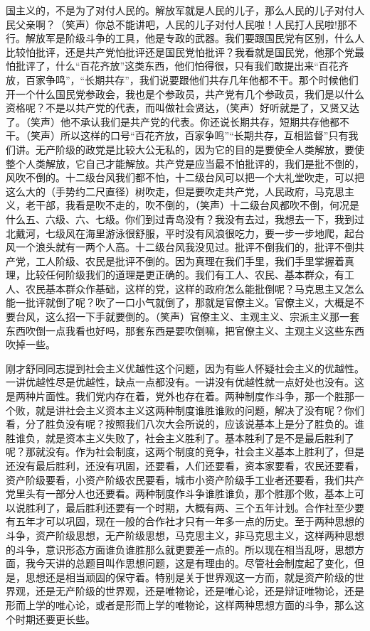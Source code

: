 国主义的，不是为了对付人民的。解放军就是人民的儿子，那么人民的儿子对付人民父亲啊？（笑声）你总不能讲吧，人民的儿子对付人民啦！人民打人民啦!那不行。解放军是阶级斗争的工具，他是专政的武器。我们要跟国民党有区别，什么人比较怕批评，还是共产党怕批评还是国民党怕批评？我看就是国民党，他那个党最怕批评了，什么“百花齐放”这类东西，他们怕得很，只有我们敢提出来“百花齐放，百家争鸣”，“长期共存”，我们说要跟他们共存几年他都不干。那个时候他们开一个什么国民党参政会，我也是个参政员，共产党有几个参政员，我们是以什么资格呢？不是以共产党的代表，而叫做社会贤达，（笑声）好听就是了，又贤又达了。（笑声）他不承认我们是共产党的代表。你还说长期共存，短期共存他都不干。（笑声）所以这样的口号“百花齐放，百家争鸣”“长期共存，互相监督”只有我们讲。无产阶级的政党是比较大公无私的，因为它的目的是要使全人类解放，要使整个人类解放，它自己才能解放。共产党是应当最不怕批评的，我们是批不倒的，风吹不倒的。十二级台风我们都不怕，十二级台风可以把一个大礼堂吹走，可以把这么大的（手势约二尺直径）树吹走，但是要吹走共产党，人民政府，马克思主义，老干部，我看是吹不走的，吹不倒的，（笑声）十二级台风都吹不倒，何况是什么五、六级、六、七级。你们到过青岛没有？我没有去过，我想去一下，我到过北戴河，七级风在海里游泳很舒服，平时没有风浪很吃力，要一步一步地爬，起台风一个浪头就有一两个人高。十二级台风我没见过。批评不倒我们的，批评不倒共产党，工人阶级、农民是批评不倒的。因为真理在我们手里，我们手里掌握着真理，比较任何阶级我们的道理是更正确的。我们有工人、农民、基本群众，有工人、农民基本群众作基础，这样的党，这样的政府怎么能批倒呢？马克思主又怎么能一批评就倒了呢？吹了一口小气就倒了，那就是官僚主义。官僚主义，大概是不要台风，这么招一下手就要倒的。（笑声）官僚主义、主观主义、宗派主义那一套东西吹倒一点我看也好吗，那套东西是要吹倒嘛，把官僚主义、主观主义这些东西吹掉一些。

刚才舒同同志提到社会主义优越性这个问题，因为有些人怀疑社会主义的优越性。一讲优越性尽是优越性，缺点一点都没有。一讲没有优越性就一点好处也没有。这是两种片面性。我们党内存在着，党外也存在着。两种制度作斗争，那一个胜那一个败，就是讲社会主义资本主义这两种制度谁胜谁败的问题，解决了没有呢？你们看，分了胜负没有呢？按照我们八次大会所说的，应该说基本上是分了胜负的。谁胜谁负，就是资本主义失败了，社会主义胜利了。基本胜利了是不是最后胜利了呢？那就没有。作为社会制度，这两个制度的竞争，社会主义基本上胜利了，但是还没有最后胜利，还没有巩固，还要看，人们还要看，资本家要看，农民还要看，资产阶级要看，小资产阶级农民要看，城市小资产阶级手工业者还要看，我们共产党里头有一部分人也还要看。两种制度作斗争谁胜谁负，那个胜那个败，基本上可以说胜利了，最后胜利还要有一个时期，大概有两、三个五年计划。合作社至少要有五年才可以巩固，现在一般的合作社才只有一年多一点的历史。至于两种思想的斗争，资产阶级思想，无产阶级思想，马克思主义，非马克思主义，这样两种思想的斗争，意识形态方面谁负谁胜那么就更要差一点的。所以现在相当乱呀，思想方面，我今天讲的总题目叫作思想问题，这是有理由的。尽管社会制度起了变化，但是，思想还是相当顽固的保守着。特别是关于世界观这一方而，就是资产阶级的世界观，还是无产阶级的世界观，还是唯物论，还是唯心论，还是辩证唯物论，还是形而上学的唯心论，或者是形而上学的唯物论，这样两种思想方面的斗争，那么这个时期还要更长些。

